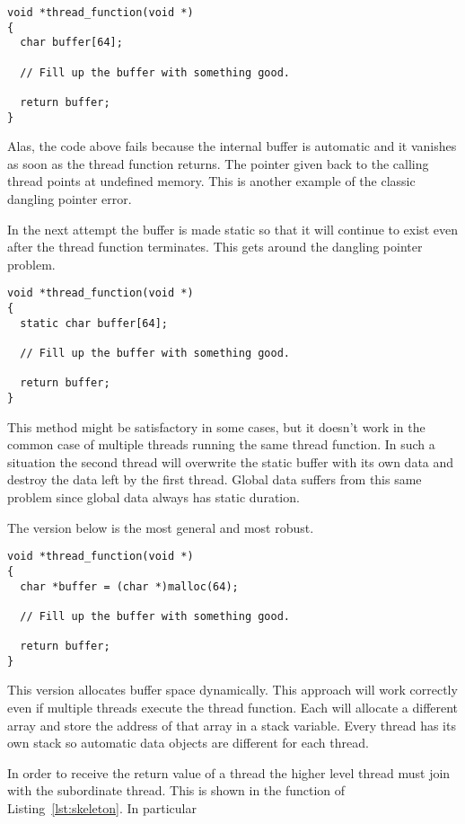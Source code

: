 \begin{lstlisting}
void *thread_function(void *)
{
  char buffer[64];

  // Fill up the buffer with something good.

  return buffer;
}
\end{lstlisting}

Alas, the code above fails because the internal buffer is automatic and it vanishes as soon as
the thread function returns. The pointer given back to the calling thread points at undefined
memory. This is another example of the classic dangling pointer error.

In the next attempt the buffer is made static so that it will continue to exist even after the
thread function terminates. This gets around the dangling pointer problem.

\begin{lstlisting}
void *thread_function(void *)
{
  static char buffer[64];

  // Fill up the buffer with something good.

  return buffer;
}
\end{lstlisting}

This method might be satisfactory in some cases, but it doesn't work in the common case of
multiple threads running the same thread function. In such a situation the second thread will
overwrite the static buffer with its own data and destroy the data left by the first thread.
Global data suffers from this same problem since global data always has static duration.

The version below is the most general and most robust.

\begin{lstlisting}
void *thread_function(void *)
{
  char *buffer = (char *)malloc(64);

  // Fill up the buffer with something good.

  return buffer;
}
\end{lstlisting}

This version allocates buffer space dynamically. This approach will work correctly even if
multiple threads execute the thread function. Each will allocate a different array and store the
address of that array in a stack variable. Every thread has its own stack so automatic data
objects are different for each thread.

In order to receive the return value of a thread the higher level thread must join with the
subordinate thread. This is shown in the  function of Listing~\ref{lst:skeleton}.
In particular

